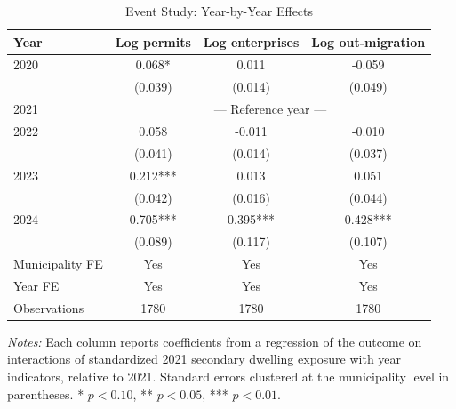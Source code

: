 \begin{table}[t]
\centering
\caption{Event Study: Year-by-Year Effects}
\label{tab:eventstudy}
\begin{tabular}{lccc}
\hline\hline
Year & Log permits & Log enterprises & Log out-migration \\
\hline
2020 & 0.068* & 0.011 & -0.059 \\
 & (0.039) & (0.014) & (0.049) \\[3pt]
2021 & \multicolumn{3}{c}{--- Reference year ---} \\[3pt]
2022 & 0.058 & -0.011 & -0.010 \\
 & (0.041) & (0.014) & (0.037) \\[3pt]
2023 & 0.212*** & 0.013 & 0.051 \\
 & (0.042) & (0.016) & (0.044) \\[3pt]
2024 & 0.705*** & 0.395*** & 0.428*** \\
 & (0.089) & (0.117) & (0.107) \\
\hline
Municipality FE & Yes & Yes & Yes \\
Year FE & Yes & Yes & Yes \\
Observations & 1780 & 1780 & 1780 \\
\hline\hline
\end{tabular}
\begin{minipage}{0.85\textwidth}
\vspace{0.3em}
\footnotesize \textit{Notes:} Each column reports coefficients from a regression of the outcome on interactions of standardized 2021 secondary dwelling exposure with year indicators, relative to 2021. Standard errors clustered at the municipality level in parentheses. * $p<0.10$, ** $p<0.05$, *** $p<0.01$.
\end{minipage}
\end{table}

